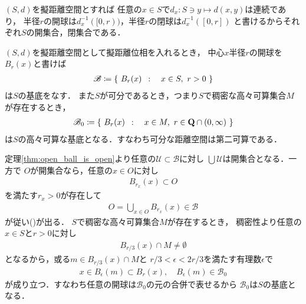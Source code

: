 	\begin{prf}
		$(S,d)$を擬距離空間とすれば
		任意の$x \in S$で$d_x:S \ni y \longmapsto d(x,y)$は連続であり，
		半径$r$の開球は$d_x^{-1}([0,r))$，半径$r$の閉球は$d_x^{-1}([0,r])$
		と書けるからそれぞれ$S$の開集合，閉集合である．
		\QED
	\end{prf}
	
	\begin{screen}
		\begin{thm}[擬距離空間において開球全体は基底をなす]
		\label{thm:base_on_pseudometric_space}
			$(S,d)$を擬距離空間として擬距離位相を入れるとき，
			中心$x$半径$r$の開球を$B_r(x)$と書けば
			\begin{align}
				\mathscr{B} \coloneqq \left\{\ B_r(x)\ \, : \quad x \in S,\ r > 0\ \right\}
				\label{eq:thm_base_on_pseudometric_space_1}
			\end{align}
			は$S$の基底をなす．
			また$S$が可分であるとき，つまり$S$で稠密な高々可算集合$M$が存在するとき，
			\begin{align}
				\mathscr{B}_0 \coloneqq \left\{\ B_r(x)\ \, : \quad x \in M,\ r \in \mathbf{Q} \cap (0,\infty)\ \right\}
			\end{align}
			は$S$の高々可算な基底となる．すなわち可分な距離空間は第二可算である．
		\end{thm}
	\end{screen}
	
	\begin{prf}
		定理\ref{thm:open_ball_is_open}より任意の$\mathscr{U} \subset \mathscr{B}$に対し
		$\bigcup \mathscr{U}$は開集合となる．一方で
		$O$が開集合なら，任意の$x \in O$に対し
		\begin{align}
			B_{r_x}(x) \subset O
		\end{align}
		を満たす$r_x > 0$が存在して
		\begin{align}
			O = \bigcup_{x \in O} B_{r_x}(x) \in \mathscr{B}
		\end{align}
		が従い()が出る．
		$S$で稠密な高々可算集合$M$が存在するとき，
		稠密性より任意の$x \in S$と$r > 0$に対し
		\begin{align}
			B_{r/3}(x) \cap M \neq \emptyset
		\end{align}
		となるから，或る$m \in B_{r/3}(x) \cap M$と
		$r/3 < \epsilon < 2r/3$を満たす有理数$\epsilon$で
		\begin{align}
			x \in B_\epsilon(m) \subset B_r(x),\quad B_\epsilon(m) \in \mathscr{B}_0
		\end{align}
		が成り立つ．すなわち任意の開球は$\mathscr{B}_0$の元の合併で表せるから
		$\mathscr{B}_0$は$S$の基底となる．
		\QED
	\end{prf}
	
